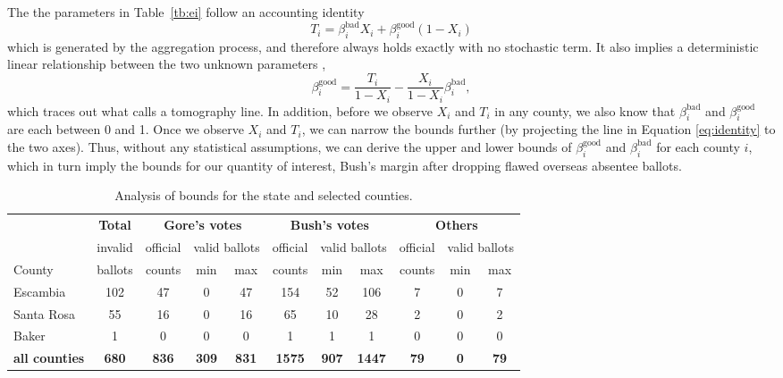 \documentclass[11pt,titlepage]{article}
\newcommand{\bb}{\beta^{\text{bad}}}
\newcommand{\bg}{\beta^{\text{good}}}
\begin{document}
The the parameters in Table~\ref{tb:ei} follow an accounting identity
\begin{equation} \label{eq:gid}
  T_i=\bb_i X_i+\bg_i (1-X_i)
\end{equation} 
which is generated by the aggregation process, and therefore always
holds exactly with no stochastic term. It also implies a deterministic
linear relationship between the two unknown parameters
\citep{dunc:davi:53},
\begin{equation} \label{eq:identity}
\bg_i = \frac{T_i}{1-X_i}-\frac{X_i}{1-X_i}\bb_i,
\end{equation}
which traces out what \citet{king:97} calls a tomography line.  In
addition, before we observe $X_i$ and $T_i$ in any county, we also
know that $\bb_i$ and $\bg_i$ are each between 0 and 1.  Once we
observe $X_i$ and $T_i$, we can narrow the bounds further (by
projecting the line in Equation \ref{eq:identity} to the two axes).
Thus, without any statistical assumptions, we can derive the upper and
lower bounds of $\bg_i$ and $\bb_i$ for each county $i$, which in turn
imply the bounds for our quantity of interest, Bush's margin after
dropping flawed overseas absentee ballots.
\begin{table}[t]
\begin{center}
\begin{tabular}{l c |ccc|ccc|ccc}
    & \bf Total & \multicolumn{3}{c|}{\bf Gore's votes} &
  \multicolumn{3}{c|}{\bf Bush's votes} &
  \multicolumn{3}{c}{\bf Others} \\
  & invalid & official & \multicolumn{2}{c|}{valid ballots} & official &
  \multicolumn{2}{c|}{valid ballots} & official &
  \multicolumn{2}{c}{valid ballots} \\
County & ballots & counts & min & max & counts & min & max & counts &
  min & max\\
\hline 
Escambia   & 102 & 47 & 0 & 47 & 154 & 52 & 106 & 7 & 0 & 7 \\
Santa Rosa &  55 & 16 & 0 & 16 &  65 & 10 &  28 & 2 & 0 & 2 \\
Baker      &  1  &  0 & 0 &  0 &   1 &  1 &   1 & 0 & 0 & 0 \\
\hline
\bf all counties & \bf 680 & \bf 836 & \bf 309 & \bf 831 & \bf 1575 &
  \bf 907 & \bf 1447 & \bf 79 & \bf 0 & \bf 79 \\ 
\end{tabular} \caption{Analysis of bounds for the state  and 
  selected counties.}\label{tb:bounds}
\end{center}
\end{table} 
\end{document}
